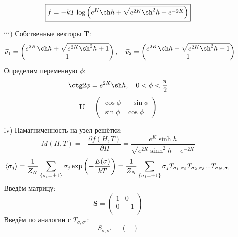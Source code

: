 \documentclass[12pt]{article}
\theoremstyle{definition}
\begin{document}
\begin{enumerate}
\begin{itemize}
    \begin{equation}
        \boxed{f=-kT\log\left(e^K\ch h+\sqrt{e^{2K}\sh^2h+e^{-2K}}\right)}
    \end{equation}
    \item[iii)] Собственные векторы \textbf{T}:
    \begin{equation}
        \Vec{v}_1=\begin{pmatrix}
        e^{2K}\ch h+\sqrt{e^{2K}\sh^2h+1}\\
        1
        \end{pmatrix},\quad\Vec{v}_2=\begin{pmatrix}
        e^{2K}\ch h-\sqrt{e^{2K}\sh^2h+1}\\
        1
        \end{pmatrix}
    \end{equation}
    Определим переменную $\phi$:
    \begin{equation}
        \ctg2\phi=e^{2K}\sh h,\quad0<\phi<\frac{\pi}{2}
    \end{equation}
    \begin{equation}
        \boxed{\textbf{U}=\begin{pmatrix}
        \cos\phi & -\sin\phi\\
        \sin\phi & \cos\phi
        \end{pmatrix}}
    \end{equation}
    \item[iv)] Намагниченность на узел решётки:
    \begin{equation}
        \boxed{M(H,T)=-\frac{\partial f(H,T)}{\partial H}=\frac{e^K\sinh h}{\sqrt{e^{2K}\sinh^2h+e^{-2K}}}}
    \end{equation}
    \begin{equation}
        \braket{\sigma_j}=\frac{1}{Z_N}\sum\limits_{\{\sigma_i=\pm1\}}\sigma_j\exp\left(-\frac{E(\sigma)}{kT}\right)=\frac{1}{Z_N}\sum\limits_{\{\sigma_i=\pm1\}}\sigma_jT_{\sigma_1,\sigma_2}T_{\sigma_2,\sigma_3}...T_{\sigma_N,\sigma_1}
    \end{equation}
    Введём матрицу:
    \begin{equation}
    \textbf{S}=\begin{pmatrix}
        1 & 0\\
        0 & -1\\
    \end{pmatrix}
    \end{equation}
    Введём по аналогии с $T_{\sigma,\sigma'}$:
    \begin{equation}
        S_{\sigma,\sigma'}=\begin{pmatrix}

\end{pmatrix}
\end{equation}
\end{itemize}
\end{enumerate}
\end{document}
